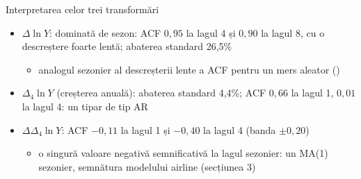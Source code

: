 \begin{frame}{Interpretarea celor trei transformări}
\itemsize{\footnotesize}
\begin{itemize}
    \item $\Delta\ln Y$: dominată de sezon: ACF $0{,}95$ la lagul 4 și $0{,}90$ la lagul 8, cu o descreștere foarte lentă; abaterea standard 26{,}5\%
    \begin{itemize}
        \item analogul sezonier al descreșterii lente a ACF pentru un mers aleator ()
    \end{itemize}
    \item $\Delta_4\ln Y$ (creșterea anuală): abaterea standard 4{,}4\%; ACF $0{,}66$ la lagul 1, $0{,}01$ la lagul 4: un tipar de tip AR
    \item $\Delta\Delta_4\ln Y$: ACF $\ensuremath{-}0{,}11$ la lagul 1 și $\ensuremath{-}0{,}40$ la lagul 4 (banda $\pm 0{,}20$)
    \begin{itemize}
        \item o singură valoare negativă semnificativă la lagul sezonier: un MA(1) sezonier, semnătura modelului airline (secțiunea 3)
    \end{itemize}
\end{itemize}
\end{frame}

